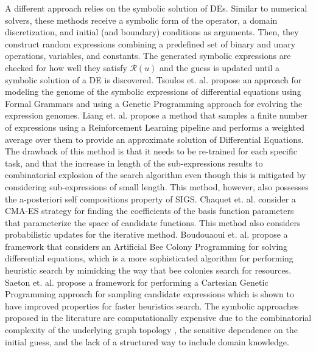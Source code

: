 A different approach relies on the symbolic solution of DEs. Similar to numerical solvers, these methods receive a symbolic form of the operator, a domain discretization, and initial (and boundary) conditions as arguments. Then, they construct random expressions combining a predefined set of binary and unary operations, variables, and constants. The generated symbolic expressions are checked for how well they satisfy $\mathcal{R}(u)$ and the guess is updated until a symbolic solution of a DE is discovered. Tsoulos et. al. \cite{Tsoulos2006SolvingDE} propose an approach for modeling the genome of the symbolic expressions of differential equations using Formal Grammars and using a Genetic Programming approach for evolving the expression genomes. Liang et. al. \cite{liang2022finite} propose a method that samples a finite number of expressions using a Reinforcement Learning pipeline and performs a weighted average over them to provide an approximate solution of Differential Equations. The drawback of this method is that it needs to be re-trained for each specific task, and that the increase in length of the sub-expressions results to combinatorial explosion of the search algorithm even though this is mitigated by considering sub-expressions of small length. This method, however, also possesses the a-posteriori self compositions property of SIGS. Chaquet et. al. \cite{chaquet2019using} consider a CMA-ES strategy for finding the coefficients of the basis function parameters that parameterize the space of candidate functions. This method also considers probabilistic updates for the iterative method. Boudouaoui et. al. \cite{boudouaoui2020solving} propose a framework that considers an Artificial Bee Colony Programming for solving differential equations, which is a more sophisticated algorithm for performing heuristic search by mimicking the way that bee colonies search for resources. Saeton et. al. \cite{seaton2010analytic} propose a framework for performing a Cartesian Genetic Programming approach for sampling candidate expressions which is shown to have improved properties for faster heuristics search. The symbolic approaches proposed in the literature are computationally expensive due to the combinatorial complexity of the underlying graph topology \cite{virgolin2022symbolic, kissas2024language}, the sensitive dependence on the initial guess, and the lack of a structured way to include domain knowledge. 

